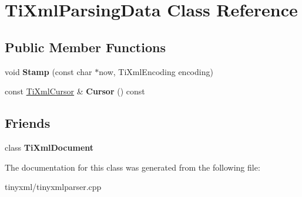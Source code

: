 \hypertarget{class_ti_xml_parsing_data}{\section{\-Ti\-Xml\-Parsing\-Data \-Class \-Reference}
\label{class_ti_xml_parsing_data}
}
\subsection*{\-Public \-Member \-Functions}
\begin{DoxyCompactItemize}
\item 
\hypertarget{class_ti_xml_parsing_data_a65cee8ab77a36c605db08c84b4c30a7d}{void {\bfseries \-Stamp} (const char $\ast$now, \-Ti\-Xml\-Encoding encoding)}\label{class_ti_xml_parsing_data_a65cee8ab77a36c605db08c84b4c30a7d}

\item 
\hypertarget{class_ti_xml_parsing_data_a9e63d965fdb53ff4ac711e105269e918}{const \hyperlink{struct_ti_xml_cursor}{\-Ti\-Xml\-Cursor} \& {\bfseries \-Cursor} () const }\label{class_ti_xml_parsing_data_a9e63d965fdb53ff4ac711e105269e918}

\end{DoxyCompactItemize}
\subsection*{\-Friends}
\begin{DoxyCompactItemize}
\item 
\hypertarget{class_ti_xml_parsing_data_a173617f6dfe902cf484ce5552b950475}{class {\bfseries \-Ti\-Xml\-Document}}\label{class_ti_xml_parsing_data_a173617f6dfe902cf484ce5552b950475}

\end{DoxyCompactItemize}


\-The documentation for this class was generated from the following file\-:\begin{DoxyCompactItemize}
\item 
tinyxml/tinyxmlparser.\-cpp\end{DoxyCompactItemize}
